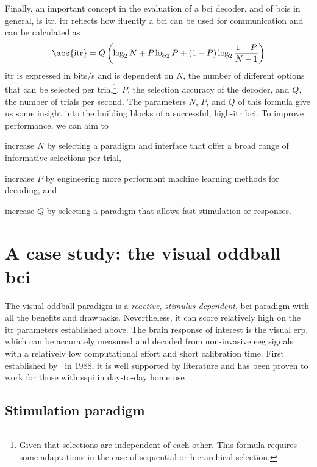 Finally, an important concept in the evaluation of a \ac{bci} decoder, and of \acp{bci}
in general, is \ac{itr}.
\Ac{itr} reflects how fluently a \ac{bci} can be used for communication and can be
calculated as
\begin{equation}
  \text{\acs{itr}} = Q\left(\log_2N+P\log_2P+(1-P)\log_2\frac{1-P}{N-1}\right)
\end{equation}
\Ac{itr} is expressed in bits/s and is dependent on $N$, the number of different options
that can be selected per trial\footnote{Given that selections are independent of each
other. This formula requires some adaptations in the case of sequential or hierarchical
selection.}, $P$, the selection accuracy of the decoder, and $Q$, the number of trials
per second.
The parameters $N$, $P$, and $Q$ of this formula give us some insight into the building
blocks of a successful, high-\ac{itr} \ac{bci}.
To improve performance, we can aim to
\begin{enumerate*}[label={\arabic*})]
\item increase $N$ by selecting a paradigm and interface that offer a broad range of
informative selections per trial,
\item increase $P$ by engineering more performant machine learning methods for decoding,
and
\item increase $Q$ by selecting a paradigm that allows fast stimulation or responses.
\end{enumerate*}

\section{A case study: the visual oddball \acs{bci}}

The visual oddball paradigm is a \emph{reactive}, \emph{stimulus-dependent},
\ac{bci} paradigm with all the benefits and drawbacks.
Nevertheless, it can score relatively high on the \ac{itr} parameters established above.
The brain response of interest is the visual \ac{erp}, which can be accurately measured
and decoded from non-invasive \ac{eeg} signals with a relatively low computational
effort and short calibration time.
First established by~\cite{Farwell1988} in 1988, it is well supported by literature and
has been proven to work for those with \acl{sspi} in day-to-day home use~\cite{Wolpaw2018}.

\subsection{Stimulation paradigm}

